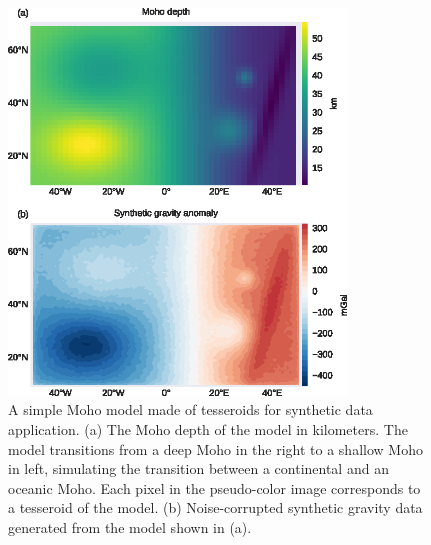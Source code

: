 \begin{figure}
    \centering
    \includegraphics[width=0.8\textwidth]{figures/paper-moho/synthetic-simple-data}
    \caption{
        A simple Moho model made of tesseroids for synthetic data application.
        (a) The Moho depth of the model in kilometers.
        The model transitions from a deep Moho in the right to a shallow Moho in
        left, simulating the transition between a continental and an oceanic
        Moho.
        Each pixel in the pseudo-color image corresponds to a tesseroid of the
        model.
        (b) Noise-corrupted synthetic gravity data generated from the model
        shown in (a).
    }
    \label{fig:moho-simple-data}
\end{figure}

